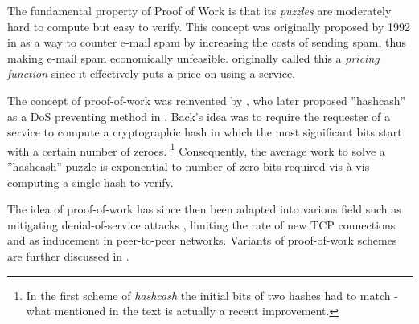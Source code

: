 

The fundamental property of Proof of Work is that its \emph{puzzles} are moderately hard to compute but easy to verify. This concept was originally proposed by \citeauthor{DworkN92} 1992 in  as a way to counter e-mail spam by increasing the costs of sending spam, thus making e-mail spam economically unfeasible. \citeauthor{DworkN92} originally called this a \emph{pricing function} since it effectively puts a price on using a service.

The concept of proof-of-work was reinvented by \citeauthor{Back02}, who later proposed ''hashcash'' as a DoS preventing method in . Back's idea was to require the requester of a service to compute a cryptographic hash in which the most significant bits start with a certain number of zeroes. \footnote{In the first scheme of \emph{hashcash} the initial bits of two hashes had to match - what mentioned in the text is actually a recent improvement.} Consequently, the average work to solve a ''hashcash'' puzzle is exponential to number of zero bits required vis-à-vis computing a single hash to verify\cite{bitcoin}.

The idea of proof-of-work has since then been adapted into various field such as mitigating denial-of-service attacks \cite{mankins}, limiting the rate of new TCP connections \cite{JuelsB99} and as inducement in peer-to-peer networks\cite{bitcoin,p2p}. Variants of proof-of-work schemes are further discussed in .

\begin{comment}
\begin{GrayBox}[0.75\textwidth]
Impose each request with a cost (e.g. show proof of work to access a service )
\end{GrayBox}
\end{comment}

